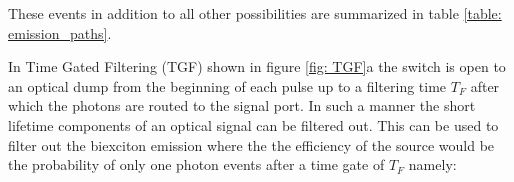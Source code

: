 \documentclass[reprint,onecolumn]{revtex4-1}
\begin{document}
These events in addition to all other possibilities  are summarized in
table \ref{table: emission_paths}.
\begin{table*}
\caption{Possible events resulting from an emitter that has a maximum of a
two photon cascade by applying a fixed time gate\label{table: emission_paths}}
\begin{centering}
\par\end{centering}

\end{table*}


In Time Gated Filtering (TGF) shown in figure \ref{fig: TGF}a the switch is open to an optical dump from the beginning of each pulse up to a filtering time $T_F$ after which the photons are routed to the signal port.
In such a manner the short lifetime components of an optical signal can be filtered out.
This can be used to filter out the biexciton emission where the  the efficiency of the source
would be the probability of only one photon events after a time gate
of $T_{F}$ namely:
\end{document}
